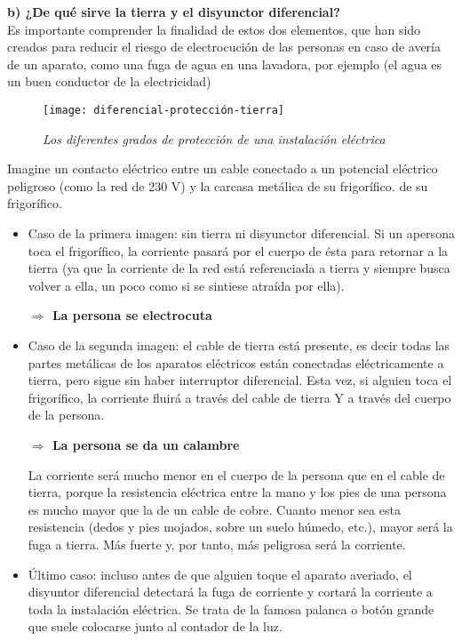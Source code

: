 \newpage
\textbf{b) ¿De qué sirve la tierra y el disyunctor diferencial?}\\
Es importante comprender la finalidad de estos dos elementos, que han sido
creados para reducir el riesgo de electrocución de las personas en caso de avería de un aparato, como una fuga de agua en una lavadora, por ejemplo (el agua es un buen conductor de la electricidad)

\begin{figure}[h]
\texttt{[image: diferencial-protección-tierra]} 
\centering
\caption*{\textit{Los diferentes grados de protección de una instalación eléctrica}}
\end{figure}

Imagine un contacto eléctrico entre un cable conectado a un potencial eléctrico peligroso
(como la red de 230 V) y la carcasa metálica de su frigorífico.
de su frigorífico.

\begin{itemize}
\item Caso de la primera imagen: sin tierra ni disyunctor diferencial.
Si un apersona toca el frigorífico, la corriente pasará por el cuerpo de ésta para retornar a la tierra (ya que la corriente de la red está referenciada a tierra y siempre busca volver a ella, un poco como si se sintiese atraída por ella).

\textbf{$\Rightarrow$ La persona se electrocuta}

\item Caso de la segunda imagen: el cable de tierra está presente, es decir
todas las partes metálicas de los aparatos eléctricos están conectadas eléctricamente a tierra, pero sigue sin haber interruptor diferencial.
Esta vez, si alguien toca el frigorífico, la corriente fluirá a través del cable de tierra Y a través del cuerpo de la persona.

\textbf{$\Rightarrow$ La persona se da un calambre}
\newpage

\begin{normalize}
La corriente será mucho menor en el cuerpo de la persona que en el cable de tierra, porque la resistencia eléctrica entre la mano y los pies de una persona es mucho mayor que la de un cable de cobre. Cuanto menor sea esta resistencia (dedos y pies mojados, sobre un suelo húmedo, etc.), mayor será la fuga a tierra. Más fuerte y, por tanto, más peligrosa será la corriente.
\end{normalize}

\item Último caso: incluso antes de que alguien toque el aparato averiado, el disyuntor diferencial detectará la fuga de corriente y cortará la corriente a toda la instalación eléctrica. Se trata de la famosa palanca o botón grande que suele colocarse junto al contador de la luz.

\end{itemize}

